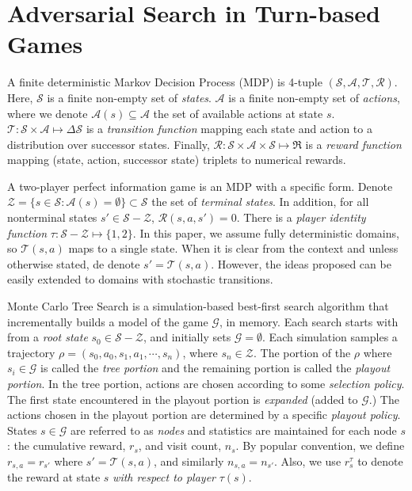 \documentclass[letterpaper]{article}
\newcommand{\cA}{\mathcal{A}}
\newcommand{\cG}{\mathcal{G}}
\newcommand{\cR}{\mathcal{R}}
\newcommand{\cS}{\mathcal{S}}
\newcommand{\cT}{\mathcal{T}}
\newcommand{\cZ}{\mathcal{Z}}
\begin{document}
\section{Adversarial Search in Turn-based Games}


A finite deterministic Markov Decision Process (MDP) is 4-tuple $(\cS, \cA, \cT, \cR)$. Here, $\cS$ is a finite non-empty set of {\it states}. 
$\cA$ is a finite non-empty set of {\it actions}, where we denote $\cA(s) \subseteq \cA$ the set of available actions at state $s$. 
$\cT : \cS \times \cA \mapsto \Delta \cS$ is a {\it transition function} mapping 
each state and action to a distribution over successor states. Finally, $\cR : \cS \times \cA \times \cS \mapsto \Re$ 
is a {\it reward function} mapping (state, action, successor state) triplets to numerical rewards. 

A two-player perfect information game is an MDP with a specific form. 
Denote $\cZ = \{ s \in \cS: \cA(s) = \emptyset \} \subset \cS$ the set of {\it terminal states}. 
In addition, for all nonterminal states $s' \in \cS - \cZ$, $\cR(s,a,s') = 0$. 
There is a {\it player identity function} $\tau : \cS - \cZ \mapsto \{1,2\}$. 
In this paper, we assume fully deterministic domains, so $\cT(s,a)$ maps to a single state. 
When it is clear from the context and unless otherwise stated, de denote $s' = \cT(s,a)$. 
However, the ideas proposed can be easily extended to domains with stochastic transitions. 

Monte Carlo Tree Search is a simulation-based best-first search algorithm that incrementally builds a model of the game 
$\cG$, in memory. Each search starts with from a {\it root state} $s_0 \in \cS - \cZ$, and initially sets $\cG = \emptyset$. 
Each simulation samples a trajectory $\rho = (s_0, a_0, s_1, a_1, \cdots, s_n)$, where $s_n \in \cZ$. 
The portion of the $\rho$ where $s_i \in \cG$ is called the {\it tree portion} and the remaining portion is
called the {\it playout portion}. In the tree portion, actions are chosen according to some {\it selection policy}. 
The first state encountered in the playout portion is {\it expanded} (added to $\cG$.) 
The actions chosen in the playout portion are determined by a specific {\it playout policy}. 
States $s \in \cG$ are referred to as {\it nodes} and statistics are  
maintained for each node $s$: the cumulative reward, $r_s$, and visit count, $n_s$. 
By popular convention, we define $r_{s,a} = r_{s'}$ where $s' = \cT(s,a)$, and similarly $n_{s,a} = n_{s'}$. 
Also, we use $r^{\tau}_s$ to denote the reward at state $s$ {\it with respect to player} $\tau(s)$. 
\end{document}
